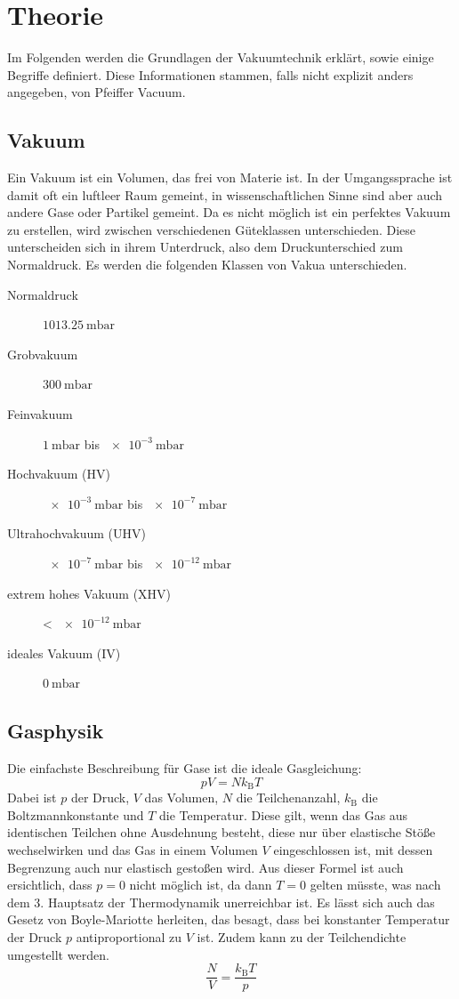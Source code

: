 \section{Theorie}
\label{sec:Theorie}
Im Folgenden werden die Grundlagen der Vakuumtechnik erklärt, sowie einige Begriffe definiert. Diese Informationen stammen, falls nicht explizit anders angegeben, von Pfeiffer Vacuum\cite{Pfeiffer}.
\subsection{Vakuum}
Ein Vakuum ist ein Volumen, das frei von Materie ist. In der Umgangssprache ist damit oft ein luftleer Raum gemeint, in wissenschaftlichen Sinne sind aber auch
andere Gase oder Partikel gemeint. Da es nicht möglich ist ein perfektes Vakuum zu erstellen, wird zwischen verschiedenen Güteklassen unterschieden. Diese
unterscheiden sich in ihrem Unterdruck, also dem Druckunterschied zum Normaldruck. Es werden die folgenden Klassen von Vakua unterschieden.
\begin{description}
	\item[Normaldruck] $\SI{1013.25}{\milli \bar}$
	\item[Grobvakuum] $\SI{300}{\milli \bar}$
	\item[Feinvakuum] $\SI{1}{\milli \bar}$ bis $\SI{e-3}{\milli \bar}$
	\item[Hochvakuum (HV)] $\SI{e-3}{\milli \bar}$ bis $\SI{e-7}{\milli \bar}$
	\item[Ultrahochvakuum (UHV)] $\SI{e-7}{\milli \bar}$ bis $\SI{e-12}{\milli \bar}$
	\item[extrem hohes Vakuum (XHV)] < $\SI{e-12}{\milli \bar}$
	\item[ideales Vakuum (IV)] $\SI{0}{\milli \bar}$
\end{description}
\subsection{Gasphysik}
Die einfachste Beschreibung für Gase ist die ideale Gasgleichung:
\begin{equation}
	pV=Nk_\text{B}T
\end{equation}
Dabei ist $p$ der Druck, $V$ das Volumen, $N$ die Teilchenanzahl, $k_\text{B}$ die Boltzmannkonstante und $T$ die Temperatur.
Diese gilt, wenn das Gas aus identischen Teilchen ohne Ausdehnung besteht, diese nur über elastische Stöße wechselwirken und das Gas in einem Volumen $V$ eingeschlossen
ist, mit dessen Begrenzung auch nur elastisch gestoßen wird. Aus dieser Formel ist auch ersichtlich, dass $p=0$ nicht möglich ist, da dann $T=0$ gelten
müsste, was nach dem 3. Hauptsatz der Thermodynamik unerreichbar ist. Es lässt sich auch das Gesetz von Boyle-Mariotte herleiten, das besagt, dass bei
 konstanter Temperatur der Druck $p$ antiproportional zu $V$ ist. Zudem kann zu der Teilchendichte umgestellt werden\cite{TuSKierfeld}.
 \begin{equation}
 	\frac{N}{V}=\frac{k_\text{B}T}{p}
 \end{equation}

